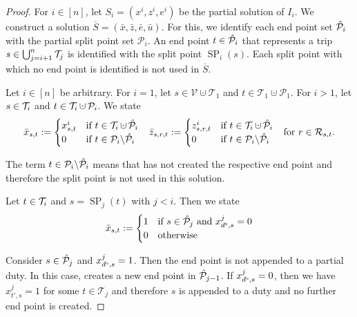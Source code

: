 \begin{proof}

For ${i\in[n]}$, let ${S_i=\left(x^i,z^i,e^i\right)}$ be the partial solution of $I_i$. We construct a solution ${\overline{S}=\left(\bar{x},\bar{z},\bar{e},\bar{u}\right)}$. For this, we identify each end point set $\hat{\mathcal{P}}_i$ with the partial split point set $\mathcal{P}_i$. An end point ${t\in\hat{\mathcal{P}}_i}$ that represents a trip ${s\in\bigcup_{j=i+1}^n \mathcal{T}_j}$ is identified with the split point $\operatorname{SP}_i(s)$. Each split point with which no end point is identified is not used in $\overline{S}$.

Let ${i\in[n]}$ be arbitrary. For ${i=1}$, let ${s\in\mathcal{V}\cupdot\mathcal{T}_1}$ and ${t\in\mathcal{T}_1\cupdot\mathcal{P}_1}$. For ${i>1}$, let ${s\in\mathcal{T}_i}$ and ${t\in\Ti\cupdot\mathcal{P}_i}$. We state
\begin{align*}
	\bar{x}_{s,t} := \begin{cases} x^i_{s,t} & \text{if } t\in\Ti\cupdot\Phat_i \\ 0 & \text{if } t\in\mathcal{P}_i\backslash\Phat_i \end{cases} &&
	\bar{z}_{s,r,t} := \begin{cases} z^i_{s,r,t} & \text{if } t\in\Ti\cupdot\Phat_i \\ 0 & \text{if } t\in\mathcal{P}_i\backslash\Phat_i \end{cases} &&
	\text{for } r\in\Rst.
\end{align*}

The term ${t\in\mathcal{P}_i\backslash\hat{\mathcal{P}}_i}$ means that  has not created the respective end point and therefore the split point is not used in this solution.

Let ${t\in\mathcal{T}_i}$ and ${s=\operatorname{SP}_j(t)}$ with ${j<i}$. Then we state
\begin{align*}
	\bar{x}_{s,t} := \begin{cases} 1 & \text{if } s\in\hat{\mathcal{P}}_j \text{ and } x^j_{d^{\operatorname{s}},s} = 0 \\ 0 & \text{otherwise} \end{cases}
\end{align*}

Consider ${s\in\hat{\mathcal{P}}_j}$ and ${x^j_{d^{\operatorname{s}},s}=1}$. Then the end point is not appended to a partial duty. In this case,  creates a new end point in $\hat{\mathcal{P}}_{j-1}$. If ${x^j_{d^{\operatorname{s}},s}=0}$, then we have ${x^j_{t',s}=1}$ for some ${t\in\mathcal{T}_j}$ and therefore $s$ is appended to a duty and no further end point is created.


\end{proof}
